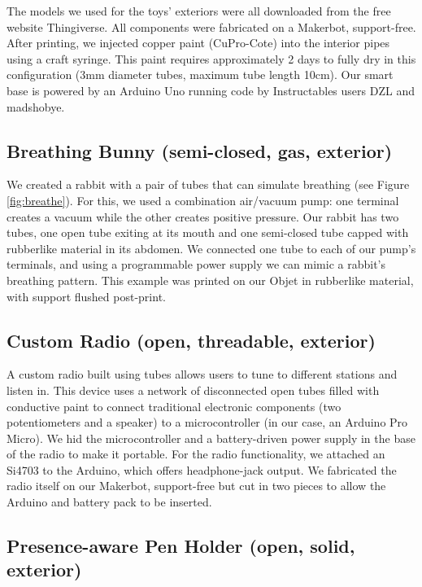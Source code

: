 The models we used for the toys' exteriors were all downloaded from the free website Thingiverse.  All components were fabricated on a Makerbot, support-free.  After printing, we injected copper paint (CuPro-Cote) into the interior pipes using a craft syringe.  This paint requires approximately 2 days to fully dry in this configuration (3mm diameter tubes, maximum tube length 10cm).  Our smart base is powered by an Arduino Uno running code by Instructables users DZL and madshobye.

\subsection{Breathing Bunny (semi-closed, gas, exterior)}

We created a rabbit with a pair of tubes that can simulate breathing (see Figure \ref{fig:breathe}).  For this, we used a combination air/vacuum pump: one terminal creates a vacuum while the other creates positive pressure.  Our rabbit has two tubes, one open tube exiting at its mouth and one semi-closed tube capped with rubberlike material in its abdomen.  We connected one tube to each of our pump's terminals, and using a programmable power supply we can mimic a rabbit's breathing pattern.  This example was printed on our Objet in rubberlike material, with support flushed post-print. 

\subsection{Custom Radio (open, threadable, exterior)}

A custom radio built using tubes allows users to tune to different stations and listen in.  This device uses a network of disconnected open tubes filled with conductive paint to connect traditional electronic components (two potentiometers and a speaker) to a microcontroller (in our case, an Arduino Pro Micro).  We hid the microcontroller and a battery-driven power supply in the base of the radio to make it portable.  For the radio functionality, we attached an Si4703 to the Arduino, which offers headphone-jack output.  We fabricated the radio itself on our Makerbot, support-free but cut in two pieces to allow the Arduino and battery pack to be inserted.

\subsection{Presence-aware Pen Holder (open, solid, exterior)}


